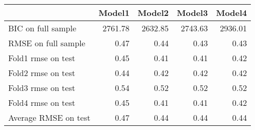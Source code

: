 \begin{tabular}{lrrrr}
\toprule
{} &   Model1 &   Model2 &   Model3 &   Model4 \\
\midrule
BIC on full sample   &  2761.78 &  2632.85 &  2743.63 &  2936.01 \\
RMSE on full sample  &     0.47 &     0.44 &     0.43 &     0.43 \\
Fold1 rmse on test   &     0.45 &     0.41 &     0.41 &     0.42 \\
Fold2 rmse on test   &     0.44 &     0.42 &     0.42 &     0.42 \\
Fold3 rmse on test   &     0.54 &     0.52 &     0.52 &     0.52 \\
Fold4 rmse on test   &     0.45 &     0.41 &     0.41 &     0.42 \\
Average RMSE on test &     0.47 &     0.44 &     0.44 &     0.44 \\
\bottomrule
\end{tabular}

